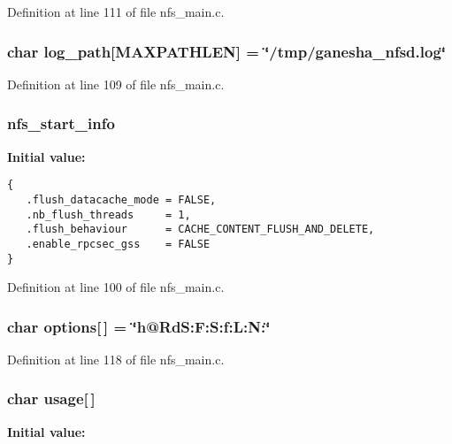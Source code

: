 Definition at line 111 of file nfs\_\-main.c.
\subsubsection{\setlength{\rightskip}{0pt plus 5cm}char {\bf log\_\-path}[MAXPATHLEN] = \char`\"{}/tmp/ganesha\_\-nfsd.log\char`\"{}}\label{nfs__main_8c_a2}




Definition at line 109 of file nfs\_\-main.c.
\subsubsection{ {\bf nfs\_\-start\_\-info}}\label{nfs__main_8c_a0}


{\bf Initial value:}

\footnotesize\begin{verbatim}
{
   .flush_datacache_mode = FALSE,
   .nb_flush_threads     = 1,
   .flush_behaviour      = CACHE_CONTENT_FLUSH_AND_DELETE,
   .enable_rpcsec_gss    = FALSE
}
\end{verbatim}\normalsize 


Definition at line 100 of file nfs\_\-main.c.
\subsubsection{\setlength{\rightskip}{0pt plus 5cm}char {\bf options}[$\,$] = \char`\"{}h@Rd\-S:F:S:f:L:N:\char`\"{}}\label{nfs__main_8c_a7}




Definition at line 118 of file nfs\_\-main.c.
\subsubsection{\setlength{\rightskip}{0pt plus 5cm}char {\bf usage}[$\,$]}\label{nfs__main_8c_a8}


{\bf Initial value:}


